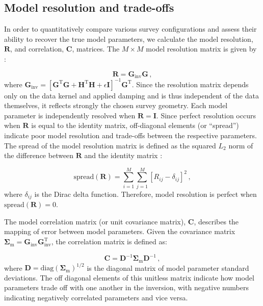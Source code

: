 \subsection{Model resolution and trade-offs}
In order to quantitatively compare various survey configurations and assess their ability to recover the true model parameters, we calculate the model resolution, $\mathbf{R}$, and correlation, $\mathbf{C}$, matrices. The $M \times M$ model resolution matrix is given by \citep{Menke2018}:

\begin{equation}
\mathbf{R} = \mathbf{G}_{\text{inv}} \mathbf{G} \,,
\end{equation}
where $\mathbf{G}_{\text{inv}}= \left[ \mathbf{G}^{\text{T}} \mathbf{G} + \mathbf{H}^{\text{T}} \mathbf{H} + \epsilon\mathbf{I} \right]^{-1} \mathbf{G}^{\text{T}}$. Since the resolution matrix depends only on the data kernel and applied damping and is thus independent of the data themselves, it reflects strongly the chosen survey geometry. Each model parameter is independently resolved when $\mathbf{R}=\mathbf{I}$. Since perfect resolution occurs when $\mathbf{R}$ is equal to the identity matrix, off-diagonal elements (or ``spread'') indicate poor model resolution and trade-offs between the respective parameters. The spread of the model resolution matrix is defined as the squared $L_2$ norm of the difference between $\mathbf{R}$ and the identity matrix \citep{Menke2018}:

\begin{equation}
\text{spread}(\mathbf{R}) = \sum_{i=1}^M\sum_{j=1}^M \left[ R_{ij}-\delta_{ij}\right]^2 \,,
\end{equation}
where $\delta_{ij}$ is the Dirac delta function. Therefore, model resolution is perfect when $\text{spread}(\mathbf{R})=0$.

The model correlation matrix (or unit covariance matrix), $\mathbf{C}$, describes the mapping of error between model parameters. Given the covariance matrix $\mathbf{\Sigma}_{\text{m}} = \mathbf{G}_{\text{inv}} \mathbf{G}_{\text{inv}}^{\text{T}}$, the correlation matrix is defined as:

\begin{equation}
\mathbf{C} = \mathbf{D}^{-1}\mathbf{\Sigma}_{\text{m}}\mathbf{D}^{-1} \,,
\end{equation}
where $\mathbf{D} = \text{diag}(\mathbf{\Sigma}_{\text{m}})^{1/2}$ is the diagonal matrix of model parameter standard deviations. The off diagonal elements of this unitless matrix indicate how model parameters trade off with one another in the inversion, with negative numbers indicating negatively correlated parameters and vice versa.







